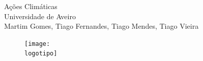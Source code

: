 \documentclass[a4paper, 11pt, onecolumn, oneside]{report}
\begin{document}
%
\def\titulo{Ações Climáticas}
\def\data{DATA}
\def\autores{Martim Gomes, Tiago Fernandes, Tiago Mendes, Tiago Vieira}
\def\autorescontactos{\textbf{Email Contacto: }tiagoafernandes@ua.pt}
\def\departamento{119488, 120271, 119378, 119655 - Dpt. de Eletrónica, Telecomunicações e Informática}
\def\empresa{Universidade de Aveiro}
\def\logotipo{ua.pdf}
%
%
\begin{titlepage}

\begin{center}
%
\vspace*{50mm}
%
{\Huge \titulo}\\ 
%
\vspace{10mm}
%
{\Large \empresa}\\
%
\vspace{10mm}
%
{\LARGE \autores}\\ 
%
\vspace{30mm}
%
\begin{figure}[h]
\center
\texttt{[image: \\logotipo]}
\end{figure}
%
\vspace{30mm}
\end{center}
%
\begin{flushright}
\end{flushright}
\end{titlepage}
\end{document}
